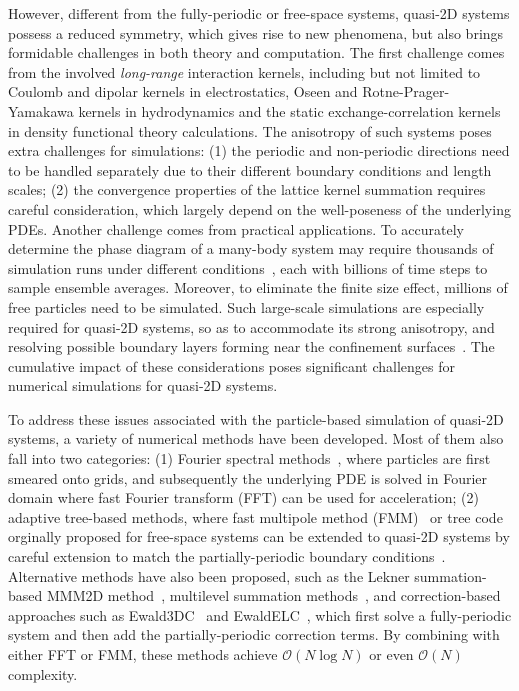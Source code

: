 However, different from the fully-periodic or free-space systems, quasi-2D systems possess a reduced symmetry, which gives rise to new phenomena, but also brings formidable challenges in both theory and computation.
The first challenge comes from the involved \emph{long-range} interaction kernels, including but not limited to Coulomb and dipolar kernels in electrostatics, Oseen and Rotne-Prager-Yamakawa kernels in hydrodynamics and the static exchange-correlation kernels in density functional theory calculations. 
The anisotropy of such systems poses extra challenges for simulations:
(1) the periodic and non-periodic directions need to be handled separately due to their different boundary conditions and length scales;
(2) the convergence properties of the lattice kernel summation requires careful consideration, which largely depend on the well-poseness of the underlying PDEs. 
Another challenge comes from practical applications.
To accurately determine the phase diagram of a many-body system may require thousands of simulation runs under different conditions~\cite{levin2002electrostatic}, each with billions of time steps to sample ensemble averages.
Moreover, to eliminate the finite size effect, millions of free particles need to be simulated. Such large-scale simulations are especially required for quasi-2D systems, so as to accommodate its strong anisotropy, and resolving possible boundary layers forming near the confinement surfaces~\cite{mazars2011long}. 
The cumulative impact of these considerations poses significant challenges for numerical simulations for quasi-2D systems. 

To address these issues associated with the particle-based simulation of quasi-2D systems, a variety of numerical methods have been developed.
Most of them also fall into two categories: 
(1) Fourier spectral methods~\cite{lindbo2012fast,nestler2015fast,doi:10.1021/acs.jctc.3c01124, maxian2021fast}, where particles are first smeared onto grids, and subsequently the underlying PDE is solved in Fourier domain where fast Fourier transform (FFT) can be used for acceleration; 
(2) adaptive tree-based methods, where fast multipole method (FMM)~\cite{greengard1987fast} or tree code~\cite{Barnes1986Nature} orginally proposed for free-space systems can be extended to quasi-2D systems by careful extension to match the partially-periodic boundary conditions~\cite{yan2018flexibly,liang2020harmonic}. 
Alternative methods have also been proposed, such as the Lekner summation-based MMM2D method~\cite{arnold2002novel}, multilevel summation methods~\cite{doi:10.1021/ct5009075,greengard2023dual}, and correction-based approaches such as Ewald3DC~\cite{yeh1999ewald} and EwaldELC~\cite{arnold2002electrostatics}, which first solve a fully-periodic system and then add the partially-periodic correction terms. 
By combining with either FFT or FMM, these methods achieve $\mathcal{O}(N\log N)$ or even $\mathcal{O}(N)$ complexity. 

